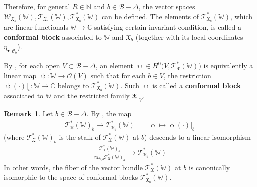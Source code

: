 \documentclass[11pt,b5paper,notitlepage]{article}
\theoremstyle{definition}
\newtheorem{rem}[df]{Remark}
\theoremstyle{plain}
\newcommand{\wtd}{\widetilde}
\newcommand{\scr}{\mathscr}
\newcommand{\sgm}{\varsigma}
\newcommand{\blt}{\bullet}
\newcommand{\Vbb}{\mathbb V}
\newcommand{\Wbb}{\mathbb W}
\newcommand{\Cbb}{\mathbb C}
\newcommand{\Nbb}{\mathbb N}
\newcommand{\<}{\left\langle}
\renewcommand{\>}{\right\rangle}
\newcommand{\MO}{\mathcal{O}}
\newcommand{\MU}{\mathcal{U}}
\newcommand{\MC}{\mathcal{C}}
\newcommand{\MB}{\mathcal{B}}
\newcommand{\fx}{\mathfrak{X}}
\newcommand{\ST}{\mathscr{T}}
\newcommand{\SW}{\mathscr{W}}
\newcommand{\mk}{\mathfrak m}
\numberwithin{equation}{section}
\begin{document}
Therefore, for general $R\in\Nbb$ and $b\in\MB-\Delta$, the vector spaces $\scr W_{\fx_b}(\Wbb),\scr T_{\fx_b}(\Wbb),\scr T^*_{\fx_b}(\Wbb)$ can be defined. The elements of  $\scr T^*_{\fx_b}(\Wbb)$, which are linear functionals $\Wbb\rightarrow\Cbb$ satisfying certain invariant condition, is called a \textbf{conformal block} associated to $\Wbb$ and $\fx_b$ (together with its local coordinates $\eta_\blt|_{\MC_b}$).

\begin{comment}
we have $\SW_\fx(\Wbb)$, a sheaf of conformal blocks $\ST_\fx^*(\Wbb)$ and a sheaf of coinvariants $\ST_\fx(\Wbb)$ associated to $\fx$ and $\Wbb$. Recall that $\SW_\fx(\Wbb)$,  $\ST_\fx^*(\Wbb)$ and $\ST_\fx(\Wbb)$ may rely on the choice of $\wtd L_\blt(0)$. For each $b\in \MB-\Delta$, we have the restriction isomorphism
 \begin{align*}
    \ST_{\fx}(\Wbb)|_b\simeq \ST_{\fx_b}(\Wbb), \quad \ST_{\fx}^*(\Wbb)|_b\simeq \ST_{\fx_b}^*(\Wbb).
 \end{align*}
\end{comment}




By \cite[Remark 3.1]{GZ2}, for each open $V\subset\MB-\Delta$, an element $\uppsi\in H^0\big(V,\ST_\fx^*(\Wbb)\big)$ is equivalently a linear map $\uppsi:\Wbb\rightarrow \MO(V)$ such that for each $b\in V$, the restriction $\uppsi(\cdot)|_b:\Wbb\rightarrow\Cbb$ belongs to $\ST^*_{\fx_b}(\Wbb)$. Such $\uppsi$ is called a \textbf{conformal block} associated to $\Wbb$ and the restricted family $\fx|_V$.


\begin{rem}\label{lb49}
Let $b\in \MB-\Delta$. By \cite[Thm 3.13]{GZ2}, the map
\begin{align*}
\ST^*_\fx(\Wbb)_b\longrightarrow\ST^*_{\fx_b}(\Wbb)\qquad\upphi\mapsto\upphi(\cdot)|_b
\end{align*}
(where $\ST^*_\fx(\Wbb)_b$ is the stalk of $\ST^*_\fx(\Wbb)$ at $b$) descends to a linear isomorphism
\begin{align}\label{eq104}
\frac{\ST^*_\fx(\Wbb)_b}{~\mk_{\MB,b}\ST^*_\fx(\Wbb)_b~}\longrightarrow\ST^*_{\fx_b}(\Wbb)
\end{align}
In other words, the fiber of the vector bundle $\ST_\fx^*(\Wbb)$ at $b$ is canonically isomorphic to the space of conformal blocks $\ST^*_{\fx_b}(\Wbb)$.
\end{rem}
\end{document}
